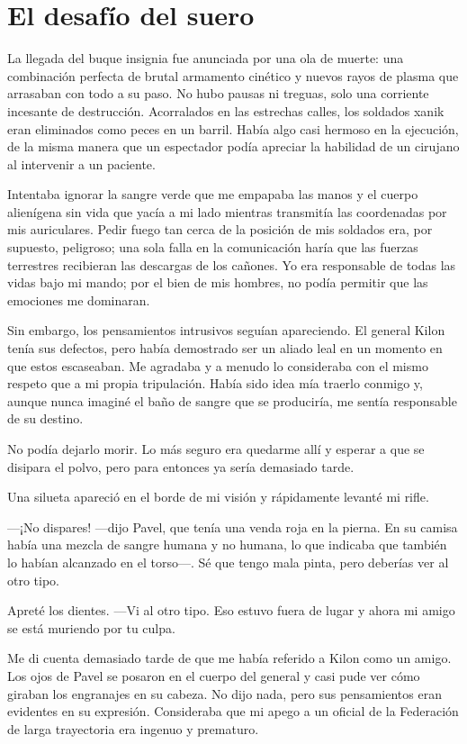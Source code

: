 \chapter{El desafío del suero}\label{sec:el-desafio-del-suero}

La llegada del buque insignia fue anunciada por una ola de muerte: una combinación perfecta de brutal armamento cinético y nuevos rayos de plasma que arrasaban con todo a su paso. No hubo pausas ni treguas, solo una corriente incesante de destrucción. Acorralados en las estrechas calles, los soldados xanik eran eliminados como peces en un barril. Había algo casi hermoso en la ejecución, de la misma manera que un espectador podía apreciar la habilidad de un cirujano al intervenir a un paciente.

Intentaba ignorar la sangre verde que me empapaba las manos y el cuerpo alienígena sin vida que yacía a mi lado mientras transmitía las coordenadas por mis auriculares. Pedir fuego tan cerca de la posición de mis soldados era, por supuesto, peligroso; una sola falla en la comunicación haría que las fuerzas terrestres recibieran las descargas de los cañones. Yo era responsable de todas las vidas bajo mi mando; por el bien de mis hombres, no podía permitir que las emociones me dominaran.

Sin embargo, los pensamientos intrusivos seguían apareciendo. El general Kilon tenía sus defectos, pero había demostrado ser un aliado leal en un momento en que estos escaseaban. Me agradaba y a menudo lo consideraba con el mismo respeto que a mi propia tripulación. Había sido idea mía traerlo conmigo y, aunque nunca imaginé el baño de sangre que se produciría, me sentía responsable de su destino.

No podía dejarlo morir. Lo más seguro era quedarme allí y esperar a que se disipara el polvo, pero para entonces ya sería demasiado tarde.

Una silueta apareció en el borde de mi visión y rápidamente levanté mi rifle.

—¡No dispares! —dijo Pavel, que tenía una venda roja en la pierna. En su camisa había una mezcla de sangre humana y no humana, lo que indicaba que también lo habían alcanzado en el torso—. Sé que tengo mala pinta, pero deberías ver al otro tipo.

Apreté los dientes. —Vi al otro tipo. Eso estuvo fuera de lugar y ahora mi amigo se está muriendo por tu culpa.

Me di cuenta demasiado tarde de que me había referido a Kilon como un amigo. Los ojos de Pavel se posaron en el cuerpo del general y casi pude ver cómo giraban los engranajes en su cabeza. No dijo nada, pero sus pensamientos eran evidentes en su expresión. Consideraba que mi apego a un oficial de la Federación de larga trayectoria era ingenuo y prematuro.

